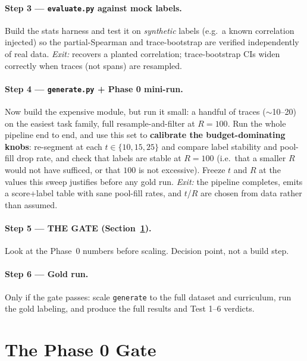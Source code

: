 \documentclass[11pt]{article}
\newcommand{\modu}[1]{\texttt{#1}}
\begin{document}
\paragraph{Step 3 --- \modu{evaluate.py} against mock labels.} Build the stats harness and test it on \emph{synthetic} labels (e.g.\ a known correlation injected) so the partial-Spearman and trace-bootstrap are verified independently of real data. \emph{Exit:} recovers a planted correlation; trace-bootstrap CIs widen correctly when traces (not spans) are resampled.

\paragraph{Step 4 --- \modu{generate.py} + Phase 0 mini-run.} Now build the expensive module, but run it small: a handful of traces ($\sim$10--20) on the easiest task family, full resample-and-filter at $R=100$. Run the whole pipeline end to end, and use this set to \textbf{calibrate the budget-dominating knobs}: re-segment at each $t\in\{10,15,25\}$ and compare label stability and pool-fill drop rate, and check that labels are stable at $R=100$ (i.e.\ that a smaller $R$ would not have sufficed, or that $100$ is not excessive). Freeze $t$ and $R$ at the values this sweep justifies before any gold run. \emph{Exit:} the pipeline completes, emits a score+label table with sane pool-fill rates, and $t$/$R$ are chosen from data rather than assumed.

\paragraph{Step 5 --- THE GATE (Section~\ref{sec:gate}).} Look at the Phase~0 numbers before scaling. Decision point, not a build step.

\paragraph{Step 6 --- Gold run.} Only if the gate passes: scale \modu{generate} to the full dataset and curriculum, run the gold labeling, and produce the full results and Test 1--6 verdicts.

\section{The Phase 0 Gate}
\label{sec:gate}
\end{document}

